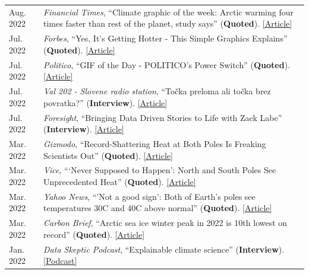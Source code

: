 \documentclass[margin,line,palatino,courier,10pt]{res}
\begin{document}
\begin{resume}
\begin{tabular}{@{}p{0.9in}p{4in}}
Aug. 2022 & \textit{Financial Times}, ``Climate graphic of the week: Arctic warming four times faster than rest of the planet, study says'' (\textbf{Quoted}). \href{https://www.ft.com/content/9bb32c6f-b3dc-46bd-944e-9e583407b866}{[Article]}\\
Jul. 2022 & \textit{Forbes}, ``Yes, It’s Getting Hotter - This Simple Graphics Explains'' (\textbf{Quoted}). \href{https://www.forbes.com/sites/marshallshepherd/2022/07/19/yes-its-getting-hotterthis-simple-graphics-explains/}{[Article]}\\
Jul. 2022 & \textit{Politico}, ``GIF of the Day - POLITICO's Power Switch'' (\textbf{Quoted}). \href{https://www.politico.com/newsletters/power-switch/2022/07/15/time-for-bidens-beast-mode-00046061}{[Article]}\\
Jul. 2022 & \textit{Val 202 - Slovene radio station}, ``To\v{c}ka preloma ali to\v{c}ka brez povratka?'' (\textbf{Interview}). \href{https://val202.rtvslo.si/podkast/vroci-mikrofon/584/174886447}{[Article]}\\
Jul. 2022 & \textit{Foresight}, ``Bringing Data Driven Stories to Life with Zack Labe'' (\textbf{Interview}). \href{https://www.climateforesight.eu/interview/bringing-data-driven-stories-to-life-with-zack-labe/}{[Article]}\\
Mar. 2022 & \textit{Gizmodo}, ``Record-Shattering Heat at Both Poles Is Freaking Scientists Out'' (\textbf{Quoted}). \href{https://gizmodo.com/record-shattering-heat-at-both-poles-is-freaking-scient-1848687193}{[Article]}\\
Mar. 2022 & \textit{Vice}, ```Never Supposed to Happen': North and South Poles See Unprecedented Heat'' (\textbf{Quoted}). \href{https://www.vice.com/en/article/5dg4va/never-supposed-to-happen-north-and-south-poles-see-unprecedented-heat}{[Article]}\\
Mar. 2022 & \textit{Yahoo News}, ``'Not a good sign': Both of Earth’s poles see temperatures 30C and 40C above normal'' (\textbf{Quoted}). \href{https://news.yahoo.com/not-a-good-sign-both-of-earths-poles-see-temperatures-30-c-and-40-c-above-normal-155815110.html}{[Article]}\\
Mar. 2022 & \textit{Carbon Brief}, ``Arctic sea ice winter peak in 2022 is 10th lowest on record'' (\textbf{Quoted}). \href{https://www.carbonbrief.org/arctic-sea-ice-winter-peak-in-2022-is-10th-lowest-on-record}{[Article]}\\
Jan. 2022 & \textit{Data Skeptic Podcast}, ``Explainable climate science'' (\textbf{Interview}). \href{https://dataskeptic.com/blog/episodes/2022/explainable-climate-science}{[Podcast]}\\

\end{tabular}
\end{resume}
\end{document}
